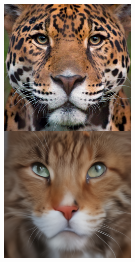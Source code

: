 \documentclass{article}
\begin{document}
\begin{figure}
\begin{minipage}[t]{0.48\textwidth}
\begin{minipage}[t]{0.19\textwidth}
            \includegraphics[width=\linewidth]{img/afhq_main/afhq256_bwd_4.png}
        \end{minipage}
        \begin{minipage}[t]{0.19\textwidth}

\end{minipage}
\end{minipage}
\end{figure}
\end{document}
